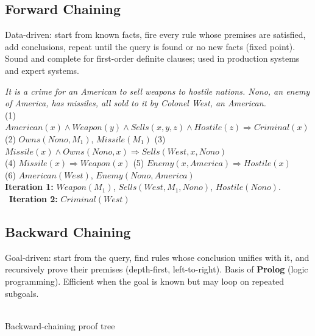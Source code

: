\subsection{Forward Chaining}
Data-driven: start from known facts, fire every rule whose premises are satisfied, add conclusions, repeat until the query is found or no new facts (fixed point). Sound and complete for first-order definite clauses; used in production systems and expert systems.
\begin{example}
\small
\textit{It is a crime for an American to sell weapons to hostile nations. Nono, an enemy of America, has missiles, all sold to it by Colonel West, an American.}\\
(1) $\textit{American}(x)\wedge\textit{Weapon}(y)\wedge\textit{Sells}(x,y,z)\wedge\textit{Hostile}(z)\Rightarrow\textit{Criminal}(x)$\\
(2) $\textit{Owns}(Nono,M_1)$, $\textit{Missile}(M_1)$ \quad (3) $\textit{Missile}(x)\wedge\textit{Owns}(Nono,x)\Rightarrow\textit{Sells}(West,x,Nono)$\\
(4) $\textit{Missile}(x)\Rightarrow\textit{Weapon}(x)$ \quad (5) $\textit{Enemy}(x,America)\Rightarrow\textit{Hostile}(x)$\\
(6) $\textit{American}(West)$, $\textit{Enemy}(Nono,America)$\\[2pt]
\textbf{Iteration 1:} $\textit{Weapon}(M_1)$, $\textit{Sells}(West,M_1,Nono)$, $\textit{Hostile}(Nono)$. \ \textbf{Iteration 2:} $\textit{Criminal}(West)$ \checkmark
\end{example}

\subsection{Backward Chaining}
Goal-driven: start from the query, find rules whose conclusion unifies with it, and recursively prove their premises (depth-first, left-to-right). Basis of \textbf{Prolog} (logic programming). Efficient when the goal is known but may loop on repeated subgoals.
\begin{center}
\\[1pt]{\small\color{slate}Backward-chaining proof tree}
\end{center}

